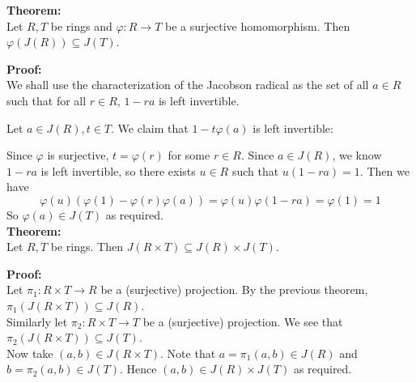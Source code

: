 \documentclass[12pt]{article}
\begin{document}
{\bf Theorem:}\\
Let $R, T$ be rings and $\varphi : R \rightarrow T$ be a surjective homomorphism.  Then $\varphi(J(R)) \subseteq J(T)$.

{\bf Proof:}\\
We shall use the characterization of the Jacobson radical as the set of all $a \in R$ such that for all $r \in R$, $1-ra$ is left invertible.

Let $a \in J(R), t \in T$.  We claim that $1-t\varphi(a)$ is left invertible:

Since $\varphi$ is surjective, $t=\varphi(r)$ for some $r \in R$.  Since $a \in J(R)$, we know $1-ra$ is left invertible, so there exists $u \in R$ such that
$u(1-ra)=1$.  Then we have
\[ \varphi(u) \left(
   \varphi(1)-\varphi(r)\varphi(a) \right)
    = \varphi(u)\varphi(1-ra) = \varphi(1)=1 \]
So $\varphi(a) \in J(T)$ as required.\\

{\bf Theorem:}\\
Let $R, T$ be rings.  Then $J(R \times T) \subseteq J(R) \times J(T)$.

{\bf Proof:}\\
Let $\pi_1 : R \times T \rightarrow R$ be a (surjective) projection.
By the previous theorem, $\pi_1(J(R \times T)) \subseteq J(R)$.\\

Similarly let $\pi_2 : R \times T \rightarrow T$ be a (surjective) projection.  We see that $\pi_2(J(R \times T)) \subseteq J(T)$.\\

Now take $(a,b) \in J(R \times T)$.  Note that $a = \pi_1(a,b) \in J(R)$ and $b = \pi_2(a,b) \in J(T)$.  Hence $(a,b) \in J(R) \times J(T)$ as required.
\end{document}
